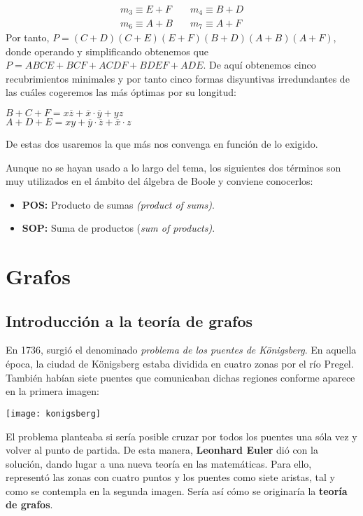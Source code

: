\begin{ejemplo}
\begin{align*}
        m_3 \equiv E + F & \quad m_4 \equiv B + D \\
        m_6 \equiv A + B & \quad m_7 \equiv A + F
    \end{align*}
    Por tanto, $P = (C+D)(C+E)(E+F)(B+D)(A+B)(A+F)$, donde operando y simplificando obtenemos que $P = ABCE+BCF+ACDF+BDEF+ADE$.
    De aquí obtenemos cinco recubrimientos minimales y por tanto cinco formas disyuntivas irredundantes de las cuáles cogeremos las más óptimas por su longitud:
    \begin{center}
        $B+C+F=x\overline{z}+\overline{x} \cdot \overline{y}+yz$ \\ $A+D+E=xy+\overline{y} \cdot \overline{z}+\overline{x} \cdot z$
    \end{center}
    De estas dos usaremos la que más nos convenga en función de lo exigido.
\end{ejemplo}
\begin{nota}
    Aunque no se hayan usado a lo largo del tema, los siguientes dos términos son muy utilizados en el ámbito del álgebra de Boole y conviene conocerlos:
    \begin{itemize}
        \item \textbf{POS:} Producto de sumas \textit{(product of sums)}.
        \item \textbf{SOP:} Suma de productos (\textit{sum of products)}.
    \end{itemize}
\end{nota}

\newpage
\section{Grafos}
\subsection{Introducción a la teoría de grafos}
En 1736, surgió el denominado \textit{problema de los puentes de Königsberg}. En aquella época, la ciudad de Königsberg estaba dividida en cuatro zonas por el río Pregel.
También habían siete puentes que comunicaban dichas regiones conforme aparece en la primera imagen:
\begin{center} \texttt{[image: konigsberg]} \end{center}
El problema planteaba si sería posible cruzar por todos los puentes una sóla vez y volver al punto de partida.
De esta manera, \textbf{Leonhard Euler} dió con la solución, dando lugar a una nueva teoría en las matemáticas. Para ello, representó las zonas con cuatro puntos y los puentes como siete aristas, tal y como se contempla en la segunda imagen.
Sería así cómo se originaría la \textbf{teoría de grafos}.

